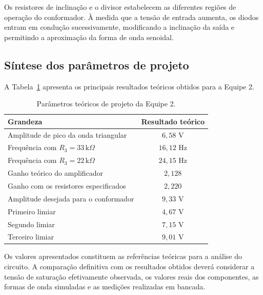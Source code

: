 \documentclass[11pt,a4paper]{article}
\begin{document}
Os resistores de inclinação e o divisor estabelecem as diferentes regiões de operação do conformador. À medida que a tensão de entrada aumenta, os diodos entram em condução sucessivamente, modificando a inclinação da saída e permitindo a aproximação da forma de onda senoidal.

\subsection{Síntese dos parâmetros de projeto}

A Tabela~\ref{tab:parametros} apresenta os principais resultados teóricos obtidos para a Equipe 2.

\begin{table}[htbp]
\centering
\caption{Parâmetros teóricos de projeto da Equipe 2.}
\label{tab:parametros}
\begin{tabular}{lc}
\hline
\textbf{Grandeza} & \textbf{Resultado teórico} \\
\hline
Amplitude de pico da onda triangular & $6,58$ V \\
Frequência com $R_3=33\,\text{k}\Omega$ & $16,12$ Hz \\
Frequência com $R_3=22\,\text{k}\Omega$ & $24,15$ Hz \\
Ganho teórico do amplificador & $2,128$ \\
Ganho com os resistores especificados & $2,220$ \\
Amplitude desejada para o conformador & $9,33$ V \\
Primeiro limiar & $4,67$ V \\
Segundo limiar & $7,15$ V \\
Terceiro limiar & $9,01$ V \\
\hline
\end{tabular}
\end{table}

Os valores apresentados constituem as referências teóricas para a análise do circuito. A comparação definitiva com os resultados obtidos deverá considerar a tensão de saturação efetivamente observada, os valores reais dos componentes, as formas de onda simuladas e as medições realizadas em bancada.
\end{document}
